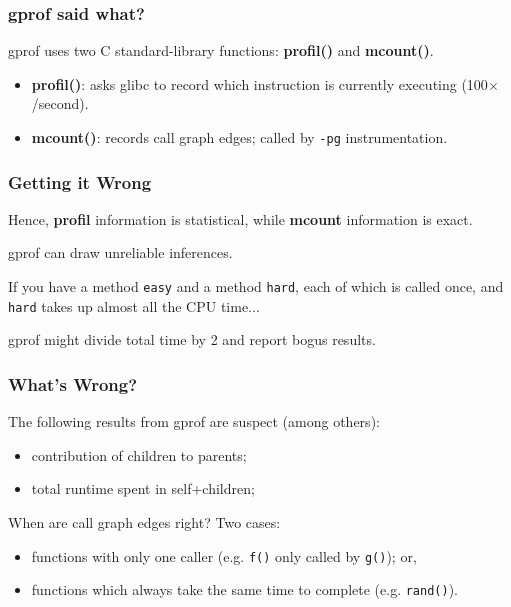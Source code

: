 \begin{frame}
\frametitle{gprof said what?}

gprof uses two C standard-library functions: {\bf profil()} and {\bf mcount()}.

\begin{itemize}
\item {\bf profil()}: asks glibc to record which instruction 
  is currently executing (100$\times$/second).
\item {\bf mcount()}: records call graph edges; called by {\tt -pg} instrumentation.
\end{itemize}


  
\end{frame}

\begin{frame}
  \frametitle{Getting it Wrong}

Hence, {\bf profil} information is statistical, while {\bf mcount}
information is exact.  

gprof can draw unreliable inferences. 

If you have a method \texttt{easy} and a method \texttt{hard}, each of which is called once, and \texttt{hard} takes up almost all the CPU time...


gprof might divide total time by 2 and report bogus results.

\end{frame}

\begin{frame}[fragile]
  \frametitle{What's Wrong?}

The following results from gprof are suspect (among others):

\begin{itemize}
  \item contribution of children to parents;
  \item total runtime spent in self+children;
\end{itemize}


When are call graph edges right?
Two cases:

    \begin{itemize}
    \item functions with only one caller
      (e.g. {\tt f()} only called by {\tt g()}); or,
    \item functions which always take the same time to complete
      (e.g. {\tt rand()}).
    \end{itemize}


\end{frame}



